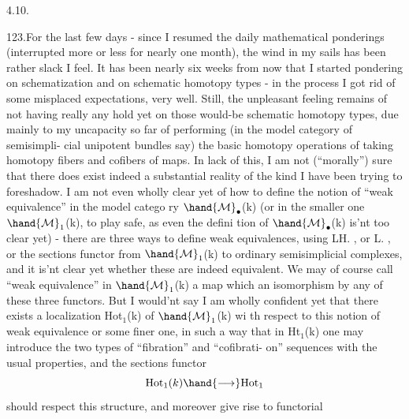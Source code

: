 
4.10.

123.\quad For the last few days  - since I resumed the daily mathematical
ponderings (interrupted more or less for nearly one month),  the wind in
my sails has been rather slack I feel.  It has been nearly six weeks
from now that I started pondering on schematization and on schematic
homotopy types - in the process I got rid of some misplaced expectations,
very well.  Still,  the unpleasant feeling remains of not having really
any hold yet on those would-be schematic homotopy types,  due mainly to
my uncapacity so far of performing (in the model category of semisimpli-%
cial unipotent bundles say) the basic homotopy operations of taking
homotopy fibers and cofibers of maps.  In lack of this,  I am not 
(``morally'') sure that there does exist indeed a substantial  reality
of the kind I have been trying to foreshadow.  I am not even wholly clear
yet of how to define the notion of ``weak equivalence'' in the model catego
ry $\hand{\mathcal{M}}_\bullet$(k) (or in the smaller one $\hand{\mathcal{M}}_1$(k), to play safe, as even the defini
tion of $\hand{\mathcal{M}}_\bullet$(k) is'nt too clear yet) -  there are three ways to define
weak equivalences,  using LH. , or L\hand{$\pi$}. , or the sections functor
from $\hand{\mathcal{M}}_1$(k) to ordinary semisimplicial complexes,  and it is'nt clear
yet whether these are indeed equivalent.  We may of course call ``weak
equivalence'' in $\hand{\mathcal{M}}_1$(k)  a map which  an isomorphism by
any of these three functors.  But I would'nt say I am wholly confident
yet that there exists  a localization Hot$_1$(k) of $\hand{\mathcal{M}}_1$(k)\hand{,} wi th respect
to this notion of weak equivalence or some finer one,  in such a way that
in Ht$_1$(k) one may introduce the two types of ``fibration'' and ``cofibrati-%
on'' sequences with the usual properties,  and the sections functor
\[ \mathrm{Hot}_1(k) \hand{\longrightarrow} \mathrm{Hot}_1 \]
should respect this structure,  and moreover give rise to functorial
